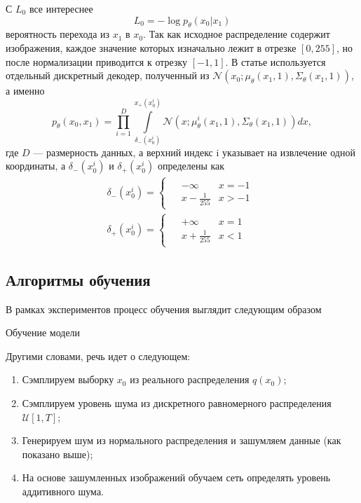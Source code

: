 \documentclass[11pt, a4paper, twocolumn, twoside]{article} %
\begin{document}
С $L_0$ все интереснее
\begin{equation*}
	L_0 = -\log p_\theta(x_0|x_1)
\end{equation*}
вероятность перехода из $x_1$ в $x_0$. Так как исходное распределение содержит изображения, каждое значение которых изначально лежит в отрезке $[0, 255]$, но после нормализации приводится к отрезку $[-1, 1]$. В статье \cite{Ho2020} используется отдельный дискретный декодер, полученный из $\mathcal{N}(x_0; \mu_\theta(x_1, 1), \Sigma_\theta(x_1, 1))$, а именно
\begin{equation}
	p_\theta(x_0, x_1) = \prod\limits_{i=1}^D\int\limits_{\delta_-(x_0^i)}^{x_+(x_0^i)} \mathcal{N}(x; \mu_\theta^i(x_1, 1), \Sigma_\theta(x_1, 1))dx,
\end{equation}
где $D$ — размерность данных, а верхний индекс i указывает на извлечение одной координаты, а $\delta_-(x_0^i)$ и $\delta_+(x_0^i)$ определены как
\begin{align}
	\delta_-(x_0^i) = 
	\begin{cases}
		\begin{aligned}
			& -\infty & x=-1 \\
			& x-\frac{1}{255} & x>-1
		\end{aligned}
	\end{cases}  \\
	\delta_+(x_0^i) = 
	\begin{cases}
		\begin{aligned}
			& +\infty & x=1 \\
			& x+\frac{1}{255} & x<1
		\end{aligned}
	\end{cases}
\end{align}

\subsection{Алгоритмы обучения}

В рамках экспериментов процесс обучения выглядит следующим образом
\begin{algorithm}
\caption{Обучение модели}\label{alg:two}
\end{algorithm}

Другими словами, речь идет о следующем:
\begin{enumerate}
  \item Сэмплируем выборку $x_0$ из реального распределения $q(x_0)$;
  \item Сэмплируем уровень шума из дискретного равномерного распределения $\mathcal{U}[1, T]$;
  \item Генерируем шум из нормального распределения и зашумляем данные (как показано выше);
  \item На основе зашумленных изображений обучаем сеть определять уровень аддитивного шума.
\end{enumerate}
\end{document}
